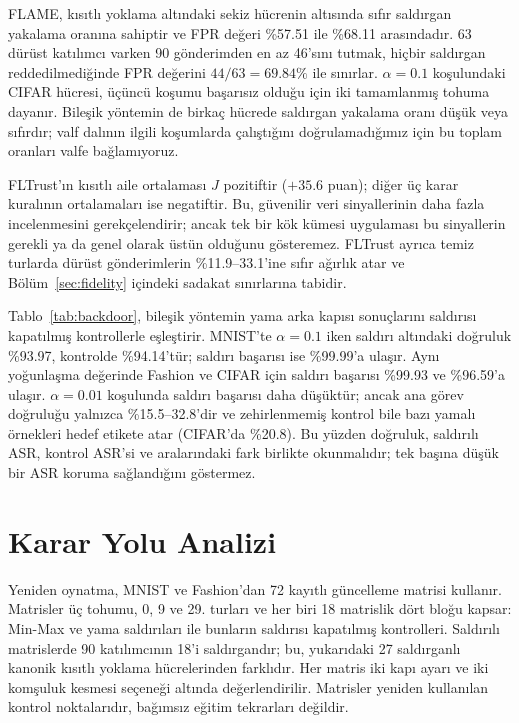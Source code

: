\documentclass[journal]{IEEEtran}
\begin{document}
FLAME, kısıtlı yoklama altındaki sekiz hücrenin altısında sıfır saldırgan yakalama oranına sahiptir ve FPR değeri \%57.51 ile \%68.11 arasındadır. 63 dürüst katılımcı varken 90 gönderimden en az 46'sını tutmak, hiçbir saldırgan reddedilmediğinde FPR değerini $44/63=69.84\%$ ile sınırlar. $\alpha=0.1$ koşulundaki CIFAR hücresi, üçüncü koşumu başarısız olduğu için iki tamamlanmış tohuma dayanır. Bileşik yöntemin de birkaç hücrede saldırgan yakalama oranı düşük veya sıfırdır; valf dalının ilgili koşumlarda çalıştığını doğrulamadığımız için bu toplam oranları valfe bağlamıyoruz.

FLTrust'ın kısıtlı aile ortalaması $J$ pozitiftir ($+35.6$ puan); diğer üç karar kuralının ortalamaları ise negatiftir. Bu, güvenilir veri sinyallerinin daha fazla incelenmesini gerekçelendirir; ancak tek bir kök kümesi uygulaması bu sinyallerin gerekli ya da genel olarak üstün olduğunu gösteremez. FLTrust ayrıca temiz turlarda dürüst gönderimlerin \%11.9--33.1'ine sıfır ağırlık atar ve Bölüm~\ref{sec:fidelity} içindeki sadakat sınırlarına tabidir.


Tablo~\ref{tab:backdoor}, bileşik yöntemin yama arka kapısı sonuçlarını saldırısı kapatılmış kontrollerle eşleştirir. MNIST'te $\alpha=0.1$ iken saldırı altındaki doğruluk \%93.97, kontrolde \%94.14'tür; saldırı başarısı ise \%99.99'a ulaşır. Aynı yoğunlaşma değerinde Fashion ve CIFAR için saldırı başarısı \%99.93 ve \%96.59'a ulaşır. $\alpha=0.01$ koşulunda saldırı başarısı daha düşüktür; ancak ana görev doğruluğu yalnızca \%15.5--32.8'dir ve zehirlenmemiş kontrol bile bazı yamalı örnekleri hedef etikete atar (CIFAR'da \%20.8). Bu yüzden doğruluk, saldırılı ASR, kontrol ASR'si ve aralarındaki fark birlikte okunmalıdır; tek başına düşük bir ASR koruma sağlandığını göstermez.

\section{Karar Yolu Analizi}\label{sec:mechanism}
Yeniden oynatma, MNIST ve Fashion'dan 72 kayıtlı güncelleme matrisi kullanır. Matrisler üç tohumu, 0, 9 ve 29. turları ve her biri 18 matrislik dört bloğu kapsar: Min-Max ve yama saldırıları ile bunların saldırısı kapatılmış kontrolleri. Saldırılı matrislerde 90 katılımcının 18'i saldırgandır; bu, yukarıdaki 27 saldırganlı kanonik kısıtlı yoklama hücrelerinden farklıdır. Her matris iki kapı ayarı ve iki komşuluk kesmesi seçeneği altında değerlendirilir. Matrisler yeniden kullanılan kontrol noktalarıdır, bağımsız eğitim tekrarları değildir.
\end{document}
